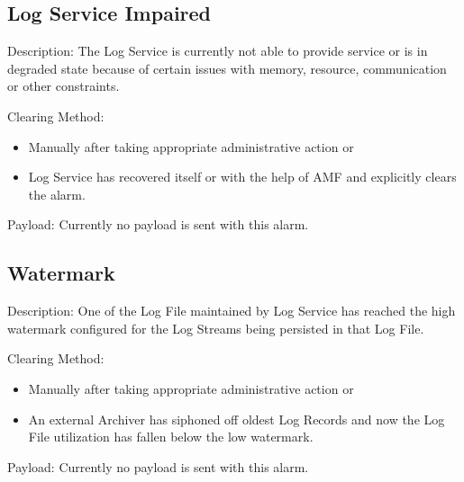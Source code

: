 \begin{flushleft}
\subsection{Log Service Impaired}
\begin{Desc}
\item[Description:]
The Log Service is currently not able to provide service or is in degraded state because of certain issues with memory, resource, communication or 
other constraints.
\end{Desc}
\begin{Desc}
\item[Clearing Method:]
\begin{itemize}
\item
Manually after taking appropriate administrative action or
\item
Log Service has recovered itself or with the help of AMF and explicitly clears the alarm.
\end{itemize}
\end{Desc}
\begin{Desc}
\item[Payload:]
Currently no payload is sent with this alarm.
\end{Desc}



\subsection{Watermark}
\begin{Desc}
\item[Description:]
One of the Log File maintained by Log Service has reached the high watermark configured for the Log Streams being persisted in that Log File.
\end{Desc}
\begin{Desc}
\item[Clearing Method:]
\begin{itemize}
\item
Manually after taking appropriate administrative action or
\item
An external Archiver has siphoned off oldest Log Records and now the Log File utilization has fallen below the low watermark.\end{itemize}
\end{Desc}
\begin{Desc}
\item[Payload:]
Currently no payload is sent with this alarm.
\end{Desc}


\end{flushleft}
